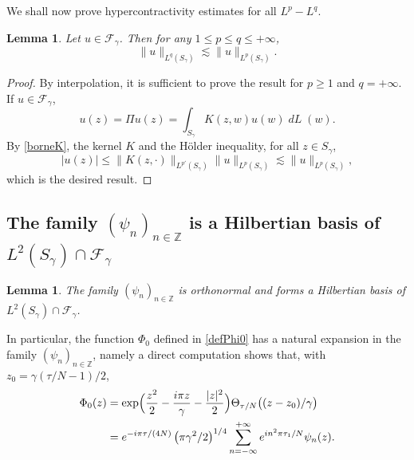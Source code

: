 \documentclass[10pt]{amsart}
\let\Subsection\subsection
\DeclareMathOperator{\dL}{\mathit{dL}}
\newtheorem{lemme}[theorem]{Lemma}
\theoremstyle{definition}
\let\EE\exp
\newcommand\Z{\mathbb Z}
\newcommand{\pa}[1]{\left(#1\right)}
\begin{document}
We shall now prove hypercontractivity estimates for all $L^p-L^q$.
\begin{lemme}
Let $u\in \mathcal{F}_{\gamma}$. Then for any $1 \leq p \leq q \leq +\infty$,
\begin{equation}\label{Carlen_bande}
\|u\|_{L^{q}(S_{\gamma})} \lesssim \|u\|_{L^{p}(S_{\gamma})}.
\end{equation}
\end{lemme}

\begin{proof}
By interpolation, it is sufficient to prove the result for $p \geq 1$ and $q= +\infty$. If $u\in \mathcal{F}_\gamma$,
\[
u(z)= \Pi u(z)=\int_{S_\gamma} K(z,w) u(w) \dL(w).
\]
By \eqref{borneK}, the kernel $K$ and the Hölder inequality, for all $z \in S_{\gamma}$,
\[
|u(z)|\leq \| K(z, \cdot)\|_{L^{p'}(S_{\gamma})} \| u\|_{L^p(S_{\gamma})} \lesssim \|u\|_{L^p(S_{\gamma})},
\]
which is the desired result.
\end{proof}

\Subsection{The family $(\psi_n)_{n \in \Z}$ is a Hilbertian basis of $L^2(S_\gamma) \cap \mathcal{F}_\gamma$}

\begin{lemme}\label{lem98}
The family $(\psi_n)_{n \in \Z}$ is orthonormal and forms a Hilbertian basis of $L^2(S_\gamma) \cap \mathcal{F}_\gamma$.
\end{lemme}

In particular, the function $\Phi_0$ defined in \eqref{defPhi0} has a natural expansion in the family $(\psi_n)_{n \in \Z}$, namely a direct computation shows that, with $z_0={\gamma}({\tau}/N-1)/2$,
\begin{align}\label{exp1}
\Phi_{0}(z)&=\EE\Bigl(\frac{z^2}2 -\frac{i\pi z} {\gamma} - \frac{|z|^2}2\Bigr) \Theta_{{\tau}/{N}}\bigl((z-z_{0})/\gamma\bigr) \nonumber \\
&= e^{-i{\pi \tau}/{(4N)}}\pa{{\pi\gamma^2}/{2}}^{1/4}\sum_{n=-\infty}^{+\infty} e^{i{n^2\pi\tau_1}/{N}}\psi_n(z).
\end{align}
\end{document}
